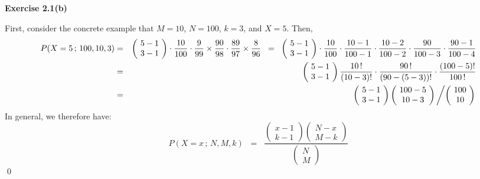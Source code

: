 \vskip 1.0cm
\noindent
\textbf{Exercise 2.1(b)}

First, consider the concrete example that $M = 10$, $N = 100$, $k = 3$, and $X = 5$.
Then,
\begin{eqnarray*}
         P(X = 5\,;\,100,10,3)
&=&      \left(\!\begin{array}{c} 5 - 1 \\ 3 - 1 \end{array}\!\right)
         \cdot \dfrac{10}{100}
         \cdot \dfrac{9}{99}
         \times\dfrac{90}{98}
         \cdot \dfrac{89}{97}
         \times\dfrac{8}{96}
\;\;=\;\;\left(\!\begin{array}{c} 5 - 1 \\ 3 - 1 \end{array}\!\right)
         \cdot\dfrac{10  }{100}
         \cdot\dfrac{10-1}{100-1}
         \cdot\dfrac{10-2}{100-2}
         \cdot\dfrac{90  }{100-3}
         \cdot\dfrac{90-1}{100-4}
\\
&=&      \left(\!\begin{array}{c} 5 - 1 \\ 3 - 1 \end{array}\!\right)
         \dfrac{10\,!}{(10-3)!} \cdot \dfrac{90\,!}{(90-(5-3))!} \cdot \dfrac{(100-5)!}{100\,!}
\\
&=&      \left(\!\begin{array}{c} 5 - 1 \\ 3 - 1 \end{array}\!\right)
         \left(\!\begin{array}{c} 100 - 5 \\ 10 - 3 \end{array}\!\right)
         \left/\left(\!\begin{array}{c} 100 \\ 10 \end{array}\!\right)\right.
\end{eqnarray*}
In general, we therefore have:
\begin{equation*}
P(X = x\,;\,N,M,k)
\;\; = \;\;
\dfrac{
\left(\!\begin{array}{c} x - 1 \\ k - 1 \end{array}\!\right)
\left(\!\begin{array}{c} N - x \\ M - k \end{array}\!\right)
}{
\left(\!\begin{array}{c} N \\ M \end{array}\!\right)
}
\end{equation*}
\qed
